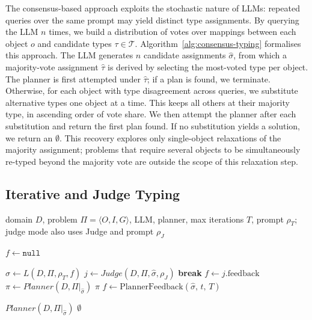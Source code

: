 The consensus-based approach exploits the stochastic nature of LLMs: repeated queries over the same prompt may yield distinct type assignments. By querying the LLM $n$ times, we build a distribution of votes over mappings between each object $o$ and candidate types $\tau \in \mathcal{T}$. Algorithm~\ref{alg:consensus-typing} formalises this approach. The LLM generates $n$ candidate assignments $\hat{\sigma}$, from which a majority-vote assignment $\hat{\tau}$ is derived by selecting the most-voted type per object. The planner is first attempted under $\hat{\tau}$; if a plan is found, we terminate. Otherwise, for each object with type disagreement across queries, we substitute alternative types one object at a time. This keeps all others at their majority type, in ascending order of vote share. We then attempt the planner after each substitution and return the first plan found. If no substitution yields a solution, we return an $\emptyset$. This recovery explores only single-object relaxations of the majority assignment; problems that require several objects to be simultaneously re-typed beyond the majority vote are outside the scope of this relaxation step.


\subsection{Iterative and Judge Typing}
\begin{algorithm}
  \caption{CAST: Iterative / Judge Variant}
  \label{alg:iterative-judge}
  \begin{algorithmic}[1]
    \footnotesize
    \Require domain $D$, problem $\Pi=\langle O,I,G\rangle$, LLM, planner, max iterations $T$, prompt $\rho_T$; judge mode also uses Judge and prompt $\rho_J$

    \State $f \gets \texttt{null}$ 

      \State $\hat{\sigma} \gets L(D, \Pi, \rho_T, f)$
        \State $j \gets Judge(D, \Pi, \hat{\sigma}, \rho_J)$
         \textbf{break} 
        \EndIf
        \State $f \gets j.\mathrm{feedback}$
      \Else {}
        \State $\pi \gets Planner(D, \Pi|_{\hat{\sigma}})$
        \If{$\pi \neq \emptyset$} \Return $\pi$ 
        \EndIf
        \State $f \gets \mathrm{PlannerFeedback}(\hat{\sigma},\, t,\, T)$
      \EndIf
    \EndFor

      \State \Return $Planner(D, \Pi|_{\hat{\sigma}})$ 
    \EndIf
    \State \Return $\emptyset$ 
  \end{algorithmic}
\end{algorithm}

